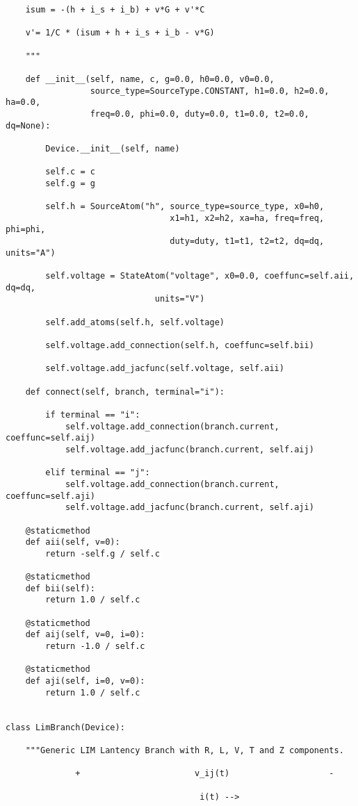 \begin{lstlisting}
    isum = -(h + i_s + i_b) + v*G + v'*C

    v'= 1/C * (isum + h + i_s + i_b - v*G)

    """

    def __init__(self, name, c, g=0.0, h0=0.0, v0=0.0,
                 source_type=SourceType.CONSTANT, h1=0.0, h2=0.0, ha=0.0,
                 freq=0.0, phi=0.0, duty=0.0, t1=0.0, t2=0.0, dq=None):

        Device.__init__(self, name)

        self.c = c
        self.g = g

        self.h = SourceAtom("h", source_type=source_type, x0=h0,
                                 x1=h1, x2=h2, xa=ha, freq=freq, phi=phi,
                                 duty=duty, t1=t1, t2=t2, dq=dq, units="A")

        self.voltage = StateAtom("voltage", x0=0.0, coeffunc=self.aii, dq=dq,
                              units="V")

        self.add_atoms(self.h, self.voltage)

        self.voltage.add_connection(self.h, coeffunc=self.bii)

        self.voltage.add_jacfunc(self.voltage, self.aii)

    def connect(self, branch, terminal="i"):

        if terminal == "i":
            self.voltage.add_connection(branch.current, coeffunc=self.aij)
            self.voltage.add_jacfunc(branch.current, self.aij)

        elif terminal == "j":
            self.voltage.add_connection(branch.current, coeffunc=self.aji)
            self.voltage.add_jacfunc(branch.current, self.aji)

    @staticmethod
    def aii(self, v=0):
        return -self.g / self.c

    @staticmethod
    def bii(self):
        return 1.0 / self.c

    @staticmethod
    def aij(self, v=0, i=0):
        return -1.0 / self.c

    @staticmethod
    def aji(self, i=0, v=0):
        return 1.0 / self.c


class LimBranch(Device):

    """Generic LIM Lantency Branch with R, L, V, T and Z components.

              +                       v_ij(t)                    -

                                       i(t) -->


\end{lstlisting}
